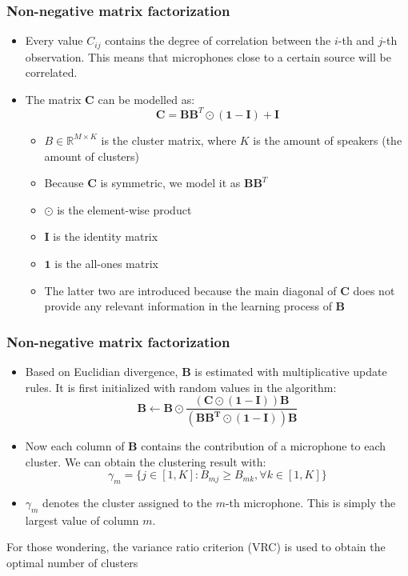 \documentclass[aspectratio=169]{beamer}
\begin{document}
\begin{frame}

\frametitle{Non-negative matrix factorization}

    \begin{itemize}
        \item Every value $C_{ij}$ contains the degree of correlation between the $i$-th and $j$-th observation. This means that microphones close to a certain source will be correlated.
        \item  The matrix $\pmb C$ can be modelled as:
        \begin{equation}
            \pmb C = \pmb B \pmb B^T \odot (\pmb 1- \pmb I) + \pmb I
        \end{equation}
        \begin{itemize}
            \item $B \in \mathbb{R}^{M \times K}$ is the cluster matrix, where $K$ is the amount of speakers (the amount of clusters)
            \item Because $\pmb C$ is symmetric, we model it as $\pmb B \pmb B^ T$
            \item $\odot$ is the element-wise product
            \item $\pmb I$ is the identity matrix 
            \item $ \pmb 1$ is the all-ones matrix
            \item The latter two are introduced because the main diagonal of $\pmb C$ does not provide any relevant information in the learning process of $\pmb B$
        \end{itemize}
    \end{itemize}
\end{frame}

\begin{frame}
\frametitle{Non-negative matrix factorization}

    \begin{itemize}
        \item Based on Euclidian divergence, $\pmb B$ is estimated with multiplicative update rules. It is first initialized with random values in the algorithm:
        \begin{equation}
            \pmb B \leftarrow \pmb B \odot \frac{(\pmb C \odot (\pmb 1- \pmb I)) \pmb B}{(\pmb B \pmb B^{\pmb T} \odot (\pmb 1 - \pmb I)) \pmb B}
        \end{equation}
        \item Now each column of $\pmb B$ contains the contribution of a microphone to each cluster. We can obtain the clustering result with:
        \begin{equation}
            \gamma_m = 
            \{ j \in [1,K] : B_{mj} \geq B_{mk}, \forall k \in [1,K] \}
        \end{equation}
        \item $\gamma_m $ denotes the cluster assigned to the $m$-th microphone. This is simply the largest value of column $m$.
    \end{itemize}
    For those wondering, the variance ratio criterion (VRC) is used to obtain the optimal number of clusters
\end{frame}
\end{document}
